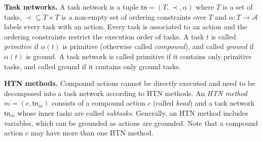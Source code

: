 \documentclass[letterpaper]{article} %
\newcommand{\Actions}{\mathcal{A}}
\newcommand{\Constraint}{\prec}
\newcommand{\tn}{\mathsf{tn}}
\begin{document}
\smallskip
\noindent\textbf{Task networks.}
A task network  %
is a tuple $\tn {=} (T,\Constraint,\alpha)$ where
$T$ is a set of tasks, $\Constraint\! {\subseteq}  T{\times} T$ is a non-empty set of ordering constraints over $T$ and $\alpha\!:\!T\!\! \longrightarrow\!\! \Actions$ labels every task with an action.
Every task is associated to an action and the ordering constraints restrict the execution order of tasks.
A task $t$ is called \emph{primitive} if $\alpha(t)$ is primitive (otherwise called \emph{compound}), and called \emph{ground} if $\alpha(t)$ is ground.
A task network is called primitive if it contains only primitive tasks, and called ground if it contains only ground tasks.



\smallskip
\noindent\textbf{HTN methods.}
Compound actions cannot be directly executed and need to be decomposed into a task network according to HTN methods.
An \emph{HTN method} $m{=}(c,{\tn_m})$ consists of %
a compound action $c$ (called \emph{head}) and a task network ${\tn_m}$ whose inner tasks are called \emph{subtasks}.
Generally, an HTN method includes variables, which can be grounded as actions are grounded.
Note that a compound action $c$ may have more than one HTN method. %
\end{document}
